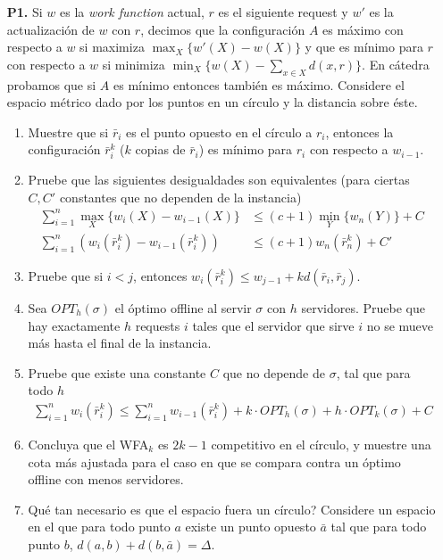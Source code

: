 \documentclass[11pt, spanish]{article}
\theoremstyle{plain}
\begin{document}
\begin{itemize}
	\item[\textbf{P1.}] Si $w$ es la \textit{work function}
		actual, $r$ es el siguiente request y $w'$ es
		la actualización de $w$ con $r$, decimos que
		la configuración $A$ es máximo con respecto a
		$w$ si maximiza $\max_X\{ w'(X)-w(X)\}$ y que es
		mínimo para $r$ con respecto a $w$ si minimiza
		$\min_X\{w(X) - \sum_{x\in X} d(x,r) \}$. En cátedra
		probamos que si $A$ es mínimo entonces tambi\'en
		es máximo. Considere el espacio m\'etrico dado
		por los puntos en un círculo y la distancia sobre
		\'este.
		\begin{enumerate}
			\item Muestre que si $\bar{r}_i$ es el punto
				opuesto en el círculo a $r_i$, entonces
				la configuración $\bar{r}_i^k$ ($k$
				copias de $\bar{r}_i$) es mínimo
				para $r_i$ con respecto a $w_{i-1}$.
			\item Pruebe que las siguientes desigualdades son
				equivalentes (para ciertas $C, C'$ constantes
				que no dependen de la instancia)
				\begin{align}
					\sum_{i=1}^n \max_X\{ w_i(X)-w_{i-1}
				(X)\}
				&\leq (c+1) \min_Y\{w_n(Y)\} + C\\
				\sum_{i=1}^n \left( w_i(\bar{r}_i^k)
				-w_{i-1}(\bar{r}_i^k) \right)
				&\leq (c+1) w_n(\bar{r}_n^k) + C'
				\end{align}
			\item Pruebe que si $i<j$, entonces
				$w_i(\bar{r}_i^k)\leq w_{j-1} + kd(\bar{r}_i,
				\bar{r}_j)$.
			\item Sea $OPT_h(\sigma)$ el óptimo offline
				al servir $\sigma$ con $h$ servidores.
				Pruebe que hay exactamente $h$ requests
				$i$ tales que el servidor que sirve $i$
				no se mueve más hasta el final de la
				instancia.
			\item Pruebe que existe una constante $C$ que no
				depende de $\sigma$, tal que para todo
				$h$
				\begin{align}
					\sum_{i=1}^n w_i(\bar{r}_i^k)\leq
					\sum_{i=1}^n w_{i-1}(\bar{r}_i^k)
					+k\cdot OPT_h(\sigma)
					+h\cdot OPT_k(\sigma) + C
				\end{align}
			\item Concluya que el WFA$_k$ es $2k-1$ competitivo
				en el círculo,
				y muestre una cota más ajustada para el
				caso en que se compara contra un óptimo
				offline con menos servidores.
			\item Qu\'e tan necesario es que el espacio
				fuera un círculo? Considere un espacio
				en el que para todo punto $a$ existe
				un punto opuesto $\bar{a}$ tal que
				para todo punto $b$, $d(a,b)+d(b,\bar{a})=
				\Delta$.
		\end{enumerate} 
    
    
\end{itemize}
\end{document}

